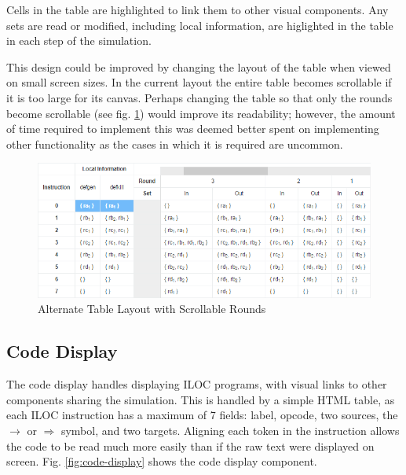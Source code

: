 \documentclass[bsc,twoside,singlespacing,parskip,logo,notimes,normalheadings]{infthesis}
\begin{document}
        Cells in the table are highlighted to link them to other
        visual components. Any sets are read or modified, including
        local information, are higlighted in the table in each step of
        the simulation.

        This design could be improved by changing the layout of the
        table when viewed on small screen sizes. In the current layout
        the entire table becomes scrollable if it is too large for its
        canvas. Perhaps changing the table so that only the rounds
        become scrollable (see fig. \ref{fig:tablescroll})
        would improve its readability; however, the amount of time
        required to implement this was deemed better spent on
        implementing other functionality as the cases in which it is
        required are uncommon.

        \begin{figure}[!ht]
          \centering
          \includegraphics[width=13cm]{img/tablescroll.png}
          \caption{Alternate Table Layout with Scrollable Rounds}\label{fig:tablescroll}
        \end{figure}

        \subsection{Code Display}\label{sec:code-display}
        The code display handles displaying ILOC programs, with visual
        links to other components sharing the simulation. This is
        handled by a simple HTML table, as each ILOC instruction has a
        maximum of 7 fields: label, opcode, two sources, the
        $\rightarrow$ or $\Rightarrow$ symbol, and two
        targets. Aligning each token in the instruction allows the
        code to be read much more easily than if the raw text were
        displayed on screen. Fig. \ref{fig:code-display} shows the
        code display component.
\end{document}
